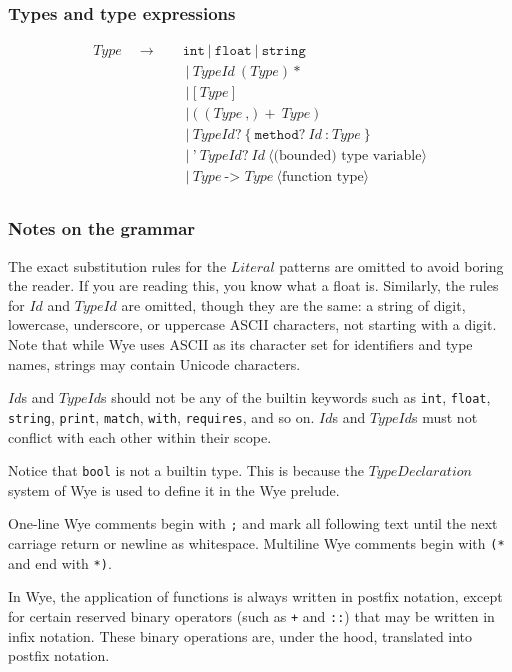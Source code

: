 \documentclass[a4paper, 12pt]{article}
\newcommand{\sepbar}{\: | \:}	%
\newcommand{\substo}{\quad\rightarrow\quad}
\renewcommand{\tt}{\texttt}
\newcommand{\la}{\langle}
\newcommand{\ra}{\rangle}
\begin{document}
\subsubsection{Types and type expressions}
\begin{align*}
Type \substo& \tt{int} \sepbar \tt{float} \sepbar \tt{string}\\
& \sepbar TypeId\: (Type)*\\
& \sepbar \tt{[}\:Type\:\tt{]}\\
& \sepbar \tt{(} \: (Type\: \tt{,} )+\: Type\: \tt{)}\\
& \sepbar TypeId? \: \tt{\{}\: \tt{method}?\: Id \: \tt{:}\: Type \: \tt{\}}\\
& \sepbar \texttt{'}\:TypeId?\: Id \: \la\text{(bounded) type variable}\ra\\
& \sepbar Type \: \tt{-> }Type\:\la\text{function type}\ra\\
\end{align*}
\subsubsection{Notes on the grammar}
The exact substitution rules for the $Literal$ patterns are omitted to avoid
boring the reader. If you are reading this, you know what a float is. Similarly,
the rules for $Id$ and $TypeId$ are omitted, though they are the same: a string
of digit, lowercase, underscore, or uppercase ASCII characters, not starting
with a digit. Note that while Wye uses ASCII as its character set for
identifiers and type names, strings may contain Unicode characters.

$Id$s and $TypeId$s should not be any of the builtin keywords such as
\tt{int}, \tt{float}, \tt{string}, \tt{print}, \tt{match},
\tt{with}, \tt{requires}, and so on. $Id$s and $TypeId$s must not conflict
with each other within their scope.

Notice that \tt{bool} is not a builtin type. This is because the
$TypeDeclaration$ system of Wye is used to define it in the Wye prelude.

One-line Wye comments begin with \tt{;} and mark all following text until
the next carriage return or newline as whitespace. Multiline Wye comments begin
with \tt{(*} and end with \tt{*)}.

In Wye, the application of functions is always written in postfix notation,
except for certain reserved binary operators (such as \tt{+} and
\tt{::}) that may be written in infix notation. These binary operations are,
under the hood, translated into postfix notation.
\end{document}
